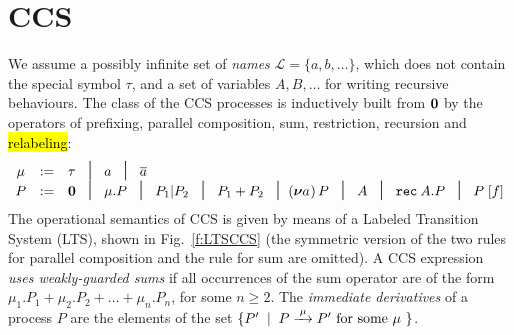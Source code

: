 
\section{CCS}
\label{ss:ccs}


We assume  a possibly infinite set of \emph{names} $\mathscr{L} = \{a, b,
\ldots\}$, which does not contain the special symbol $\tau$, and
a set of variables $A,B, \ldots$ for writing recursive behaviours. 
The class  of the CCS processes is inductively built from ${\boldsymbol 0}$ by the operators
of  prefixing, parallel composition,  sum, restriction, recursion and \hl{relabeling}:
\begin{equation*}
\begin{array}{ccl}
\mu  & := &  \tau \hspace{.3pt} \; \midd \; a  \; \midd \;  \outC a  \\
P  & := &  \nil \; \midd \;  \mu . P \; \midd \;  P_1 |  P_2 \; \midd  \;
P_1 + P_2 \; \midd %
  (\res a\!)\, P  \;  \midd \;  A \; \midd \; \recu A  P
\; \midd \; P\; [f]  %
\end{array}
\end{equation*}
The operational semantics of CCS is given by means of
a Labeled Transition System (LTS), shown in Fig.~\ref{f:LTSCCS} (the symmetric version of the two rules for
parallel composition and the rule for sum are omitted).
A CCS expression \emph{uses weakly-guarded sums} if all occurrences of
the sum  operator are of the form $\mu_1.P_1 + \mu_2.P_2 + \ldots
+ \mu_n.P_n$, for some $n \geq 2$. 
 The \emph{immediate derivatives} of a
process $P$ are the elements of  the set $\{P' \st P \arr\mu P' \mbox{ for some $\mu$ }
\}$.   
